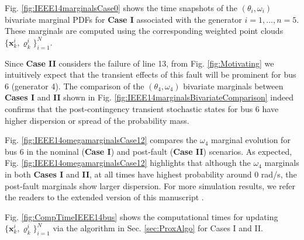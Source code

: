 \documentclass[10pt,twocolumn]{IEEEtran}
\newcommand{\red}{\color{red}}
\begin{document}
Fig. \ref{fig:IEEE14marginalsCase0} shows the time snapshots of the $(\theta_{i},\omega_{i})$ bivariate marginal PDFs for \textbf{Case I} associated with the generator $i=1,\hdots, n=5$. These marginals are computed using the corresponding weighted point clouds $\{\bm{x}_{k}^{i},\varrho_{k}^{i}\}_{i=1}^{N}$. 

Since \textbf{Case II} considers the failure of line 13, from Fig. \ref{fig:Motivating} we intuitively expect that the transient effects of this fault will be prominent for bus 6 (generator 4). The comparison of the $(\theta_4,\omega_4)$ bivariate marginals between \textbf{Cases I} and \textbf{II} shown in Fig. \ref{fig:IEEE14marginalsBivariateComparison} indeed confirms that the post-contingency transient stochastic states for bus 6 have higher dispersion or spread of the probability mass. 

Fig. \ref{fig:IEEE14omegamarginalsCase12} compares the $\omega_{4}$ marginal evolution for bus 6 in the nominal (\textbf{Case I}) and post-fault (\textbf{Case II}) scenarios. As expected, Fig. \ref{fig:IEEE14omegamarginalsCase12} highlights that although the $\omega_{4}$ marginals in both \textbf{Cases I} and \textbf{II}, at all times have highest probability around $0$ rad/s, the post-fault marginals show larger dispersion. For more simulation results, we refer the readers to the extended version of this manuscript \cite[see Fig. 6 and 7(a),(b)]{halder2021stochasticExpanded}. 





Fig. \ref{fig:CompTimeIEEE14bus} shows the computational times for updating $\{\bm{x}_{k}^{i},\varrho_{k}^{i}\}_{i=1}^{N}$ via the algorithm in Sec. \ref{sec:ProxAlgo} for Cases I and II.  
\end{document}
